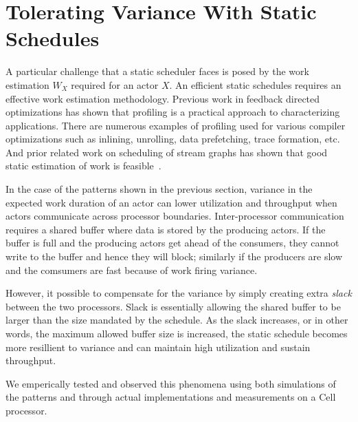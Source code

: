 \section{Tolerating Variance With Static Schedules}

A particular challenge that a static scheduler faces is posed by the
work estimation $W_X$ required for an actor $X$. An efficient static
schedules requires an effective work estimation methodology. Previous
work in feedback directed optimizations has shown that profiling is a
practical approach to characterizing applications. There are numerous
examples of profiling used for various compiler optimizations such as
inlining, unrolling, data prefetching, trace formation, etc. And prior
related work on scheduling of stream graphs has shown that good static
estimation of work is
feasible~\cite{mgordon-asplos04,mgordon-asplos06}.

In the case of the patterns shown in the previous section, variance in
the expected work duration of an actor can lower utilization and
throughput when actors communicate across processor
boundaries. Inter-processor communication requires a shared buffer
where data is stored by the producing actors. If the buffer is full
and the producing actors get ahead of the consumers, they cannot write
to the buffer and hence they will block; similarly if the producers
are slow and the comsumers are fast because of work firing variance.

However, it possible to compensate for the variance by simply creating
extra {\it slack} between the two processors. Slack is essentially
allowing the shared buffer to be larger than the size mandated by the
schedule. As the slack increases, or in other words, the maximum
allowed buffer size is increased, the static schedule becomes more
resillient to variance and can maintain high utilization and sustain
throughput.

We emperically tested and observed this phenomena using both
simulations of the patterns and through actual implementations and
measurements on a Cell processor.